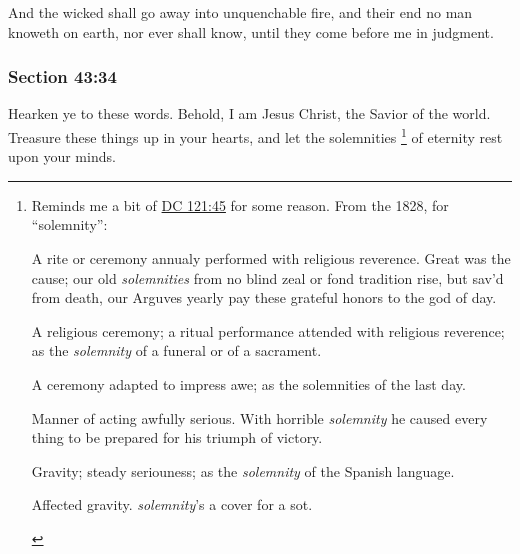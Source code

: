 		And the wicked shall go away into unquenchable fire, and their end no man knoweth on earth, nor ever shall know, until they come before me in judgment.


	\subsubsection{Section 43:34} %
		\label{DC43-34}

		Hearken ye to these words.  Behold, I am Jesus Christ, the Savior of the world.  Treasure these things up in your hearts, and let the solemnities%
		\footnote{%
			Reminds me a bit of \hyperref[DC121-45]{DC 121:45} for some reason. From the 1828, for ``solemnity'':
				\begin{compactitem}
					\item[1] A rite or ceremony annualy performed with religious reverence. Great was the cause; our old \textit{solemnities} from no blind zeal or fond tradition rise, but sav'd from death, our Arguves yearly pay these grateful honors to the god of day.
					\item[2] A religious ceremony; a ritual performance attended with religious reverence; as the \textit{solemnity} of a funeral or of a sacrament.
					\item[3] A ceremony adapted to impress awe; as the solemnities of the last day.
					\item[4] Manner of acting awfully serious. With horrible \textit{solemnity} he caused every thing to be prepared for his triumph of victory.
					\item[5] Gravity; steady seriouness; as the \textit{solemnity} of the Spanish language.
					\item[6] Affected gravity. \textit{solemnity}'s a cover for a sot.
				\end{compactitem}
			} 
		of eternity rest upon your minds.


